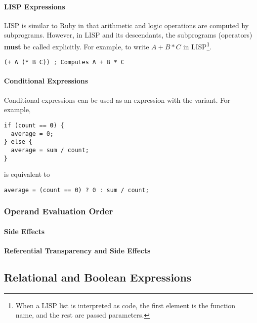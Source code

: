 \paragraph{LISP Expressions}\label{par:Operator_Evaluation_Order-LISP_Expressions}
LISP is similar to Ruby in that arithmetic and logic operations are computed by subprograms.
However, in LISP and its descendants, the subprograms (operators) \textbf{must} be called explicitly.
For example, to write $A + B * C$ in LISP\footnote{When a LISP list is interpreted as code, the first element is the function name, and the rest are passed parameters.}.
\begin{verbatim}
(+ A (* B C)) ; Computes A + B * C
\end{verbatim}

\paragraph{Conditional Expressions}\label{par:Operator_Evaluation_Order-Conditional_Expressions}
Conditional expressions can be used as an expression with the  variant.
For example,
\begin{verbatim}
if (count == 0) {
  average = 0;
} else {
  average = sum / count;
}
\end{verbatim}
is equivalent to
\begin{verbatim}
average = (count == 0) ? 0 : sum / count;
\end{verbatim}

\subsubsection{Operand Evaluation Order}\label{subsubsec:Operand_Evaluation_Order}
\paragraph{Side Effects}\label{par:Operand_Evaluation-Side_Effects}
\paragraph{Referential Transparency and Side Effects}\label{par:Operand_Evaluation-Referential_Transparency_Side_Effects}

\subsection{Relational and Boolean Expressions}\label{subsec:Relational_Boolean_Expressions}
